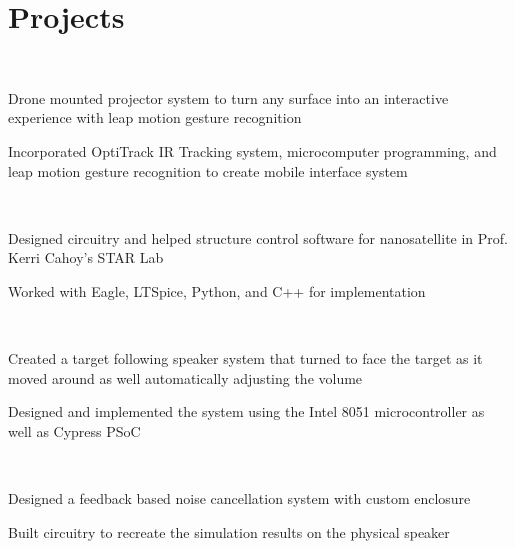 \documentclass[letterpaper, article]{deedy-resume-openfont}
\begin{document}
\begin{minipage}[t]{0.66\textwidth}
\section{Projects}
\\
\begin{tightemize}
	\item Drone mounted projector system to turn any surface into an interactive experience with leap motion gesture recognition
	\item Incorporated OptiTrack IR Tracking system, microcomputer programming, and leap motion gesture recognition to create mobile interface system
\end{tightemize}

\\
\begin{tightemize}
	\item Designed circuitry and helped structure control software for nanosatellite in Prof. Kerri Cahoy's STAR Lab
	\item Worked with Eagle, LTSpice, Python, and C++ for implementation
\end{tightemize}

\\
\begin{tightemize}
	\item Created a target following speaker system that turned to face the target as it moved around as well automatically adjusting the volume
	\item Designed and implemented the system using the Intel 8051 microcontroller as well as Cypress PSoC
\end{tightemize}

\\
\begin{tightemize}
	\item Designed a feedback based noise cancellation system with custom enclosure
	\item Built circuitry to recreate the simulation results on the physical speaker
\end{tightemize}



\end{minipage}
\end{document}
